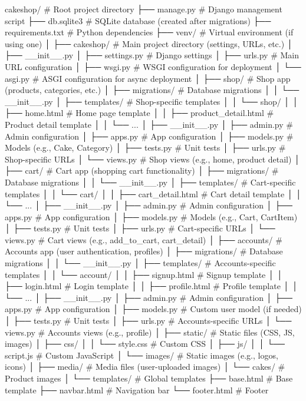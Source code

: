 cakeshop/                  # Root project directory
├── manage.py              # Django management script
├── db.sqlite3             # SQLite database (created after migrations)
├── requirements.txt       # Python dependencies
├── venv/                  # Virtual environment (if using one)
│
├── cakeshop/              # Main project directory (settings, URLs, etc.)
│   ├── __init__.py
│   ├── settings.py        # Django settings
│   ├── urls.py            # Main URL configuration
│   ├── wsgi.py            # WSGI configuration for deployment
│   └── asgi.py            # ASGI configuration for async deployment
│
├── shop/                  # Shop app (products, categories, etc.)
│   ├── migrations/        # Database migrations
│   │   └── __init__.py
│   ├── templates/         # Shop-specific templates
│   │   └── shop/
│   │       ├── home.html  # Home page template
│   │       ├── product_detail.html  # Product detail template
│   │       └── ...
│   ├── __init__.py
│   ├── admin.py           # Admin configuration
│   ├── apps.py            # App configuration
│   ├── models.py          # Models (e.g., Cake, Category)
│   ├── tests.py           # Unit tests
│   ├── urls.py            # Shop-specific URLs
│   └── views.py           # Shop views (e.g., home, product detail)
│
├── cart/                  # Cart app (shopping cart functionality)
│   ├── migrations/        # Database migrations
│   │   └── __init__.py
│   ├── templates/         # Cart-specific templates
│   │   └── cart/
│   │       ├── cart_detail.html  # Cart detail template
│   │       └── ...
│   ├── __init__.py
│   ├── admin.py           # Admin configuration
│   ├── apps.py            # App configuration
│   ├── models.py          # Models (e.g., Cart, CartItem)
│   ├── tests.py           # Unit tests
│   ├── urls.py            # Cart-specific URLs
│   └── views.py           # Cart views (e.g., add_to_cart, cart_detail)
│
├── accounts/              # Accounts app (user authentication, profiles)
│   ├── migrations/        # Database migrations
│   │   └── __init__.py
│   ├── templates/         # Accounts-specific templates
│   │   └── account/
│   │       ├── signup.html  # Signup template
│   │       ├── login.html   # Login template
│   │       ├── profile.html # Profile template
│   │       └── ...
│   ├── __init__.py
│   ├── admin.py           # Admin configuration
│   ├── apps.py            # App configuration
│   ├── models.py          # Custom user model (if needed)
│   ├── tests.py           # Unit tests
│   ├── urls.py            # Accounts-specific URLs
│   └── views.py           # Accounts views (e.g., profile)
│
├── static/                # Static files (CSS, JS, images)
│   ├── css/
│   │   └── style.css      # Custom CSS
│   ├── js/
│   │   └── script.js      # Custom JavaScript
│   └── images/            # Static images (e.g., logos, icons)
│
├── media/                 # Media files (user-uploaded images)
│   └── cakes/             # Product images
│
└── templates/             # Global templates
    ├── base.html          # Base template
    ├── navbar.html        # Navigation bar
    └── footer.html        # Footer